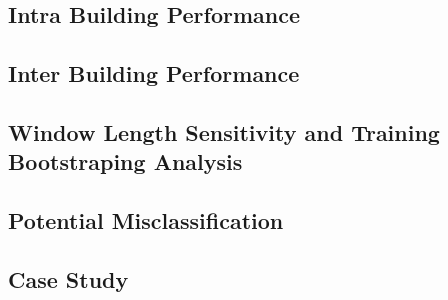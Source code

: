 \subsection{Intra Building Performance}

\subsection{Inter Building Performance}


\subsection{Window Length Sensitivity and Training Bootstraping Analysis}

\subsection{Potential Misclassification}

\subsection{Case Study}
